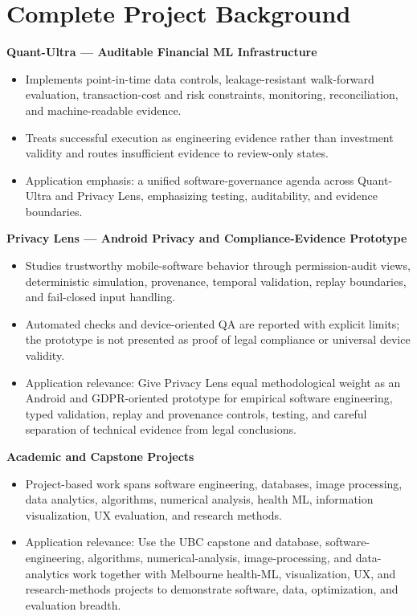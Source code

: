 \documentclass[11pt]{article}
\begin{document}
\section*{Complete Project Background}
\textbf{Quant-Ultra --- Auditable Financial ML Infrastructure}
\begin{itemize}
\item Implements point-in-time data controls, leakage-resistant walk-forward evaluation, transaction-cost and risk constraints, monitoring, reconciliation, and machine-readable evidence.
\item Treats successful execution as engineering evidence rather than investment validity and routes insufficient evidence to review-only states.
\item Application emphasis: a unified software-governance agenda across Quant-Ultra and Privacy Lens, emphasizing testing, auditability, and evidence boundaries.
\end{itemize}

\textbf{Privacy Lens --- Android Privacy and Compliance-Evidence Prototype}
\begin{itemize}
\item Studies trustworthy mobile-software behavior through permission-audit views, deterministic simulation, provenance, temporal validation, replay boundaries, and fail-closed input handling.
\item Automated checks and device-oriented QA are reported with explicit limits; the prototype is not presented as proof of legal compliance or universal device validity.
\item Application relevance: Give Privacy Lens equal methodological weight as an Android and GDPR-oriented prototype for empirical software engineering, typed validation, replay and provenance controls, testing, and careful separation of technical evidence from legal conclusions.
\end{itemize}

\textbf{Academic and Capstone Projects}
\begin{itemize}
\item Project-based work spans software engineering, databases, image processing, data analytics, algorithms, numerical analysis, health ML, information visualization, UX evaluation, and research methods.
\item Application relevance: Use the UBC capstone and database, software-engineering, algorithms, numerical-analysis, image-processing, and data-analytics work together with Melbourne health-ML, visualization, UX, and research-methods projects to demonstrate software, data, optimization, and evaluation breadth.
\end{itemize}
\end{document}
